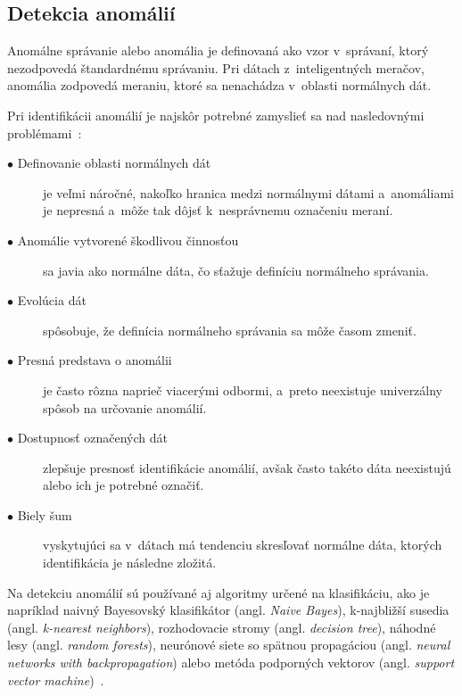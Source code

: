 \documentclass[a4paper,twoside,slovak,12pt,appendix]{article}
\begin{document}

\subsection{Detekcia anomálií}
Anomálne správanie alebo anomália je definovaná ako vzor v~správaní, ktorý
nezodpovedá štandardnému správaniu. Pri dátach z~inteligentných meračov,
anomália zodpovedá meraniu, ktoré sa nenachádza v~oblasti normálnych dát.

Pri identifikácii anomálií je najskôr potrebné zamyslieť sa nad nasledovnými
problémami~\cite{Chandola2009}:
\begin{description}
	\item[$\bullet$ Definovanie oblasti normálnych dát] je veľmi náročné, nakoľko
	hranica medzi normálnymi dátami a~anomáliami je nepresná a~môže tak dôjsť
	k~nesprávnemu označeniu meraní.
	\item[$\bullet$ Anomálie vytvorené škodlivou činnosťou] sa javia ako normálne
	dáta, čo sťažuje definíciu normálneho správania.
	\item[$\bullet$ Evolúcia dát] spôsobuje, že definícia normálneho správania sa
	môže časom zmeniť.
	\item[$\bullet$ Presná predstava o anomálii] je často rôzna naprieč viacerými
	odbormi, a~preto neexistuje univerzálny spôsob na určovanie anomálií.
	\item[$\bullet$ Dostupnosť označených dát] zlepšuje presnosť identifikácie
	anomálií, avšak často takéto dáta neexistujú alebo ich je potrebné označiť.
	\item[$\bullet$ Biely šum] vyskytujúci sa v~dátach má tendenciu skresľovať
	normálne dáta, ktorých identifikácia je následne zložitá.
\end{description}

Na detekciu anomálií sú používané aj algoritmy určené na klasifikáciu, ako je
napríklad naivný Bayesovský klasifikátor (angl. \textit{Naive Bayes}),
k-najbližší susedia (angl. \textit{k-nearest neighbors}), rozhodovacie stromy
(angl. \textit{decision tree}), náhodné lesy (angl. \textit{random forests}),
neurónové siete so spätnou propagáciou (angl. \textit{neural networks with
backpropagation}) alebo metóda podporných vektorov (angl. \textit{support vector
machine})~\cite{Coma-Puig2016}.

\end{document}
